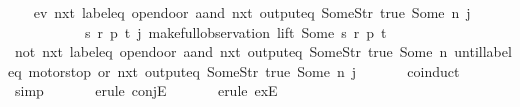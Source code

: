 \begin{isabellebody}
{\isanewline}%
%
\isadelimproof
%
\endisadelimproof
%
\isatagproof
{}\isamarkupfalse%
{\isacharminus}\isanewline
\ \ \isacommand{{\isacharbraceleft}}\isamarkupfalse%
\isamarkupfalse%
\ {\isachardoublequoteopen}{\isacharparenleft}ev\ {\isacharparenleft}nxt\ {\isacharparenleft}{\isacharparenleft}label{\isacharunderscore}eq\ {\isacharprime}{\isacharprime}opendoor{\isacharprime}{\isacharprime}{\isacharparenright}\ aand\ {\isacharparenleft}nxt\ {\isacharparenleft}output{\isacharunderscore}eq\ {\isacharbrackleft}Some{\isacharparenleft}Str\ {\isacharprime}{\isacharprime}true{\isacharprime}{\isacharprime}{\isacharparenright}{\isacharcomma}\ Some\ n{\isacharbrackright}{\isacharparenright}{\isacharparenright}{\isacharparenright}{\isacharparenright}{\isacharparenright}\ j\ {\isasymand}\isanewline
\ \ \ \ \ \ \ \ \ \ \ {\isacharparenleft}{\isasymexists}s\ r\ p\ t{\isachardot}\ j{\isacharequal}\ make{\isacharunderscore}full{\isacharunderscore}observation\ lift\ {\isacharparenleft}Some\ s{\isacharparenright}\ r\ p\ t{\isacharparenright}{\isachardoublequoteclose}\isanewline
\ \ \ \isamarkupfalse%
\ {\isachardoublequoteopen}{\isacharparenleft}{\isacharparenleft}not\ {\isacharparenleft}nxt\ {\isacharparenleft}label{\isacharunderscore}eq\ {\isacharprime}{\isacharprime}opendoor{\isacharprime}{\isacharprime}\ aand\ {\isacharparenleft}nxt\ {\isacharparenleft}output{\isacharunderscore}eq\ {\isacharbrackleft}Some{\isacharparenleft}Str\ {\isacharprime}{\isacharprime}true{\isacharprime}{\isacharprime}{\isacharparenright}{\isacharcomma}\ Some\ n{\isacharbrackright}{\isacharparenright}{\isacharparenright}{\isacharparenright}{\isacharparenright}{\isacharparenright}\ until{\isacharparenleft}{\isacharparenleft}{\isacharparenleft}label{\isacharunderscore}eq\ {\isacharprime}{\isacharprime}motorstop{\isacharprime}{\isacharprime}{\isacharparenright}\ or\ {\isacharparenleft}nxt\ {\isacharparenleft}output{\isacharunderscore}eq\ {\isacharbrackleft}Some{\isacharparenleft}Str\ {\isacharprime}{\isacharprime}true{\isacharprime}{\isacharprime}{\isacharparenright}{\isacharcomma}\ Some\ n{\isacharbrackright}{\isacharparenright}{\isacharparenright}{\isacharparenright}{\isacharparenright}{\isacharparenright}\ j{\isachardoublequoteclose}\isanewline
\ \ \ \ \ \isamarkupfalse%
\ coinduct\isanewline
\ \ \ \ \ \isamarkupfalse%
\ simp\isanewline
\ \ \ \ \ \isamarkupfalse%
\ {\isacharparenleft}erule\ conjE{\isacharparenright}\isanewline
\ \ \ \ \ \isamarkupfalse%
\ {\isacharparenleft}erule\ exE{\isacharparenright}{\isacharplus}\isanewline

\end{isabellebody}
